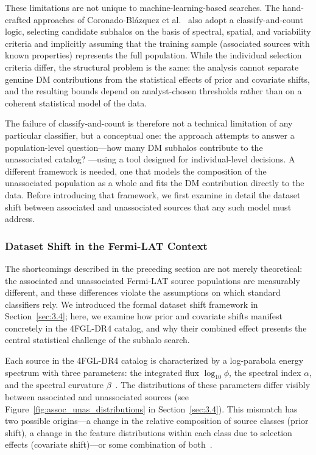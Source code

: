 These limitations are not unique to machine-learning-based searches.
The hand-crafted approaches of Coronado-Bl\'azquez et al.~\cite{2019JCAP...07..020C, 2019JCAP...11..045C} also adopt a classify-and-count logic, selecting candidate subhalos on the basis of spectral, spatial, and variability criteria and implicitly assuming that the training sample (associated sources with known properties) represents the full population.
While the individual selection criteria differ, the structural problem is the same: the analysis cannot separate genuine DM contributions from the statistical effects of prior and covariate shifts, and the resulting bounds depend on analyst-chosen thresholds rather than on a coherent statistical model of the data.

The failure of classify-and-count is therefore not a technical limitation of any particular classifier, but a conceptual one: the approach attempts to answer a population-level question---how many DM subhalos contribute to the unassociated catalog?
---using a tool designed for individual-level decisions.
A different framework is needed, one that models the composition of the unassociated population as a whole and fits the DM contribution directly to the data.
Before introducing that framework, we first examine in detail the dataset shift between associated and unassociated sources that any such model must address.

\subsubsection{Dataset Shift in the Fermi-LAT Context}
\label{sec:5.5.2}

The shortcomings described in the preceding section are not merely theoretical: the associated and unassociated Fermi-LAT source populations are measurably different, and these differences violate the assumptions on which standard classifiers rely.
We introduced the formal dataset shift framework in Section~\ref{sec:3.4}; here, we examine how prior and covariate shifts manifest concretely in the 4FGL-DR4 catalog, and why their combined effect presents the central statistical challenge of the subhalo search.

Each source in the 4FGL-DR4 catalog is characterized by a log-parabola energy spectrum with three parameters: the integrated flux $\log_{10}\phi$, the spectral index $\alpha$, and the spectral curvature $\beta$~\cite{2023arXiv230712546B}.
The distributions of these parameters differ visibly between associated and unassociated sources (see Figure~\ref{fig:assoc_unas_distributions} in Section~\ref{sec:3.4}).
This mismatch has two possible origins---a change in the relative composition of source classes (prior shift), a change in the feature distributions within each class due to selection effects (covariate shift)---or some combination of both~\cite{MorenoTorres2012AUV, Amerio:2025fhz}.

